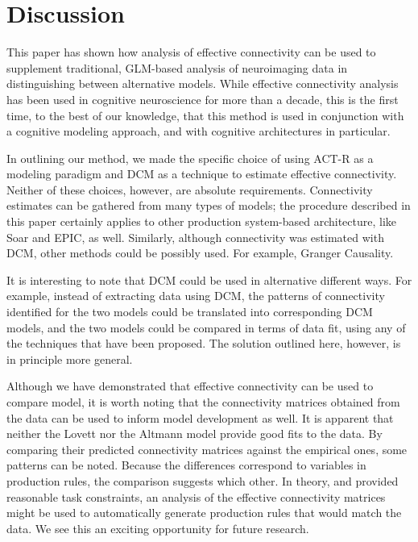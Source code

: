 \documentclass[10pt,letterpaper]{article}
\begin{document}
\section{Discussion}

This paper has shown how analysis of effective connectivity can be used to supplement traditional, GLM-based analysis of neuroimaging data in distinguishing between alternative models. While effective connectivity analysis has been used in cognitive neuroscience for more than a decade, this is the first time, to the best of our knowledge, that this method is used in conjunction with a cognitive modeling approach, and with cognitive architectures in particular.

In outlining our method, we made the specific choice of using ACT-R as a modeling paradigm and DCM as a technique to estimate effective connectivity. Neither of these choices, however, are absolute requirements. Connectivity estimates can be gathered from many types of models; the procedure described in this paper certainly applies to other production system-based architecture, like Soar and EPIC, as well. Similarly, although connectivity was estimated with DCM,  other methods could be possibly used. For example, Granger Causality. %

It is interesting to note that DCM could be used in alternative different ways. For example, instead of extracting data using DCM, the patterns of connectivity identified for the two models could be translated into corresponding DCM models, and the two models could be compared in terms of data fit, using any of the techniques that have been proposed. The solution outlined here, however, is in principle more general.

Although we have demonstrated that effective connectivity can be used to compare model, it is worth noting that the connectivity matrices obtained from the data can be used to inform model development as well. It is apparent that neither the Lovett nor the Altmann model provide good fits to the data. By comparing their predicted connectivity matrices against the empirical ones, some patterns can be noted. Because the differences correspond to variables in production rules, the comparison suggests which other. In theory, and provided reasonable task constraints, an analysis of the effective connectivity matrices might be used to automatically generate production rules that would match the data. We see this an exciting opportunity for future research.
\end{document}
